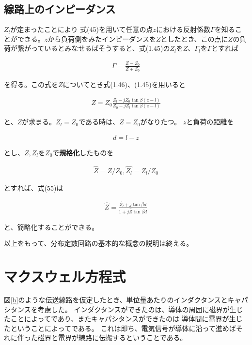 \documentclass[7pt,uplatex,dvipdfmx,twocolumn]{jsarticle}
\begin{document}
  \subsection{線路上のインピーダンス}
  
  $Z_l$が定まったことにより
  式(45)を用いて任意の点$z$における反射係数$\varGamma$を知ることができる。$z$から負荷側をみたインピーダンスを$Z$としたとき、この点に$Z$の負荷が繋がっているとみなせるばそうすると、式(1.45)の$Z_l$を$Z$、$\varGamma _l$を$\varGamma$とすれば
  
  \begin{align}
  \varGamma=\frac{Z-Z_0}{Z+Z_0}
  \end{align}
  
  を得る。この式を$Z$についてとき式(1.46)、(1.45)を用いると
  
  \begin{align}
  Z=Z_0\frac{Z_l-jZ_0\tan\beta\left(z-l\right)}{Z_0-jZ_l\tan\beta\left(z-l\right)}
  \end{align}
  
  と、$Z$が求まる。$Z_l=Z_0$である時は、$Z=Z_0$がなりたつ。 
  $z$と負荷の距離を

  \begin{align}
  d=l-z
  \end{align}

とし、$Z,Z_l$を$Z_0$で\textbf{規格化}したものを

\begin{align}
\hat{Z}=Z/Z_0,\hat{Z_l}=Z_l/Z_0
\end{align}

とすれば、式(55)は

\begin{align}
\hat{Z}=\frac{\hat{Z_l}+j\tan\beta d}{1+j\hat{Z}\tan\beta d}
\end{align}

と、簡略化することができる。

以上をもって、分布定数回路の基本的な概念の説明は終える。

\section{マクスウェル方程式}

図\ref{b}のような伝送線路を仮定したとき、単位量あたりのインダクタンスとキャパシタンスを考慮した。
インダクタンスができたのは、導体の周囲に磁界が生じたことによってであり、またキャパシタンスができたのは
導体間に電界が生じたということによってである。
これは即ち、電気信号が導体に沿って進めばそれに伴った磁界と電界が線路に伝搬するということである。
\end{document}
